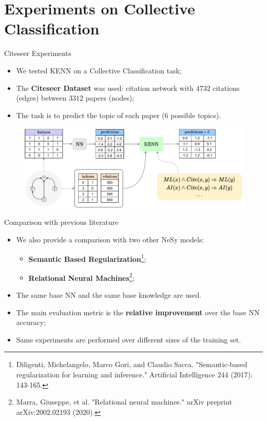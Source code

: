 \documentclass{beamer}
\begin{document}
\section{Experiments on Collective Classification}

\begin{frame}{Citeseer Experiments}
	\begin{itemize}
		\item We tested KENN on a Collective Classification task;
		\item The \textbf{Citeseer Dataset} was used: citation network with $4732$ citations (edges) between $3312$ papers (nodes);
		\item The task is to predict the topic of each paper (6 possible topics).
	\end{itemize}

\begin{figure}
	\includegraphics[width=\linewidth]{images/citeseer_setup_pres2.pdf}
\end{figure}
\end{frame}

\begin{frame}{Comparison with previous literature}
	\begin{itemize}
		\item We also provide a comparison with two other NeSy models:
		\begin{itemize}
			\item \textbf{Semantic Based Regularization}\footnote{Diligenti, Michelangelo, Marco Gori, and Claudio Sacca. "Semantic-based regularization for learning and inference." Artificial Intelligence 244 (2017): 143-165.};
			\item \textbf{Relational Neural Machines}\footnote{Marra, Giuseppe, et al. "Relational neural machines." arXiv preprint arXiv:2002.02193 (2020). \vspace{18pt}};
		\end{itemize}
	\pause
	
		\item The same base NN and the same base knowledge are used.
		\pause

		\item The main evaluation metric is the \textbf{relative improvement} over the base NN accuracy;
		\pause

		\item Same experiments are performed over different sizes of the training set.
	\end{itemize}
	
	
\end{frame}
\end{document}
